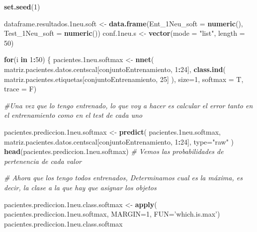 \documentclass[]{article}
\newenvironment{Shaded}{\begin{snugshade}}{\end{snugshade}}
\newcommand{\CommentTok}[1]{\textcolor[rgb]{0.56,0.35,0.01}{\textit{#1}}}
\newcommand{\ControlFlowTok}[1]{\textcolor[rgb]{0.13,0.29,0.53}{\textbf{#1}}}
\newcommand{\DataTypeTok}[1]{\textcolor[rgb]{0.13,0.29,0.53}{#1}}
\newcommand{\DecValTok}[1]{\textcolor[rgb]{0.00,0.00,0.81}{#1}}
\newcommand{\FloatTok}[1]{\textcolor[rgb]{0.00,0.00,0.81}{#1}}
\newcommand{\KeywordTok}[1]{\textcolor[rgb]{0.13,0.29,0.53}{\textbf{#1}}}
\newcommand{\NormalTok}[1]{#1}
\newcommand{\OperatorTok}[1]{\textcolor[rgb]{0.81,0.36,0.00}{\textbf{#1}}}
\newcommand{\StringTok}[1]{\textcolor[rgb]{0.31,0.60,0.02}{#1}}
\begin{document}
\begin{Shaded}
\begin{Highlighting}[]
\KeywordTok{set.seed}\NormalTok{(}\DecValTok{1}\NormalTok{)}

\NormalTok{dataframe.resultados}\FloatTok{.1}\NormalTok{neu.soft <-}\StringTok{ }\KeywordTok{data.frame}\NormalTok{(}\DataTypeTok{Ent_1Neu_soft =} \KeywordTok{numeric}\NormalTok{(),}
                                             \DataTypeTok{Test_1Neu_soft =} \KeywordTok{numeric}\NormalTok{())}
\NormalTok{conf}\FloatTok{.1}\NormalTok{neu.s <-}\StringTok{ }\KeywordTok{vector}\NormalTok{(}\DataTypeTok{mode =} \StringTok{"list"}\NormalTok{, }\DataTypeTok{length =} \DecValTok{50}\NormalTok{)}

\ControlFlowTok{for}\NormalTok{(i }\ControlFlowTok{in} \DecValTok{1}\OperatorTok{:}\DecValTok{50}\NormalTok{)}
\NormalTok{\{}
\NormalTok{  pacientes}\FloatTok{.1}\NormalTok{neu.softmax <-}\StringTok{ }\KeywordTok{nnet}\NormalTok{( matriz.pacientes.datos.centscal[conjuntoEntrenamiento, }\DecValTok{1}\OperatorTok{:}\DecValTok{24}\NormalTok{],}
                                  \KeywordTok{class.ind}\NormalTok{( matriz.pacientes.etiquetas[conjuntoEntrenamiento, }\DecValTok{25}\NormalTok{] ),}
                                  \DataTypeTok{size=}\DecValTok{1}\NormalTok{,}
                                  \DataTypeTok{softmax =}\NormalTok{ T,}
                                  \DataTypeTok{trace =}\NormalTok{ F)}

  \CommentTok{#Una vez que lo tengo entrenado, lo que voy a hacer es calcular el error tanto en el entrenamiento como en el test de cada uno}
  
\NormalTok{  pacientes.prediccion}\FloatTok{.1}\NormalTok{neu.softmax <-}\StringTok{ }\KeywordTok{predict}\NormalTok{( pacientes}\FloatTok{.1}\NormalTok{neu.softmax, }
\NormalTok{                                                matriz.pacientes.datos.centscal[conjuntoEntrenamiento, }\DecValTok{1}\OperatorTok{:}\DecValTok{24}\NormalTok{], }
                                                \DataTypeTok{type=}\StringTok{"raw"}\NormalTok{ )}
  \KeywordTok{head}\NormalTok{(pacientes.prediccion}\FloatTok{.1}\NormalTok{neu.softmax) }\CommentTok{# Vemos las probabilidades de pertenencia de cada valor}
  
  \CommentTok{# Ahora que los tengo todos entrenados, Determinamos cual es la máxima, es decir, la clase a la que hay que asignar los objetos}
  
\NormalTok{  pacientes.prediccion}\FloatTok{.1}\NormalTok{neu.class.softmax <-}\StringTok{ }\KeywordTok{apply}\NormalTok{( pacientes.prediccion}\FloatTok{.1}\NormalTok{neu.softmax, }\DataTypeTok{MARGIN=}\DecValTok{1}\NormalTok{, }\DataTypeTok{FUN=}\StringTok{'which.is.max'}\NormalTok{)}
\NormalTok{  pacientes.prediccion}\FloatTok{.1}\NormalTok{neu.class.softmax}
  

\end{Highlighting}
\end{Shaded}
\end{document}

